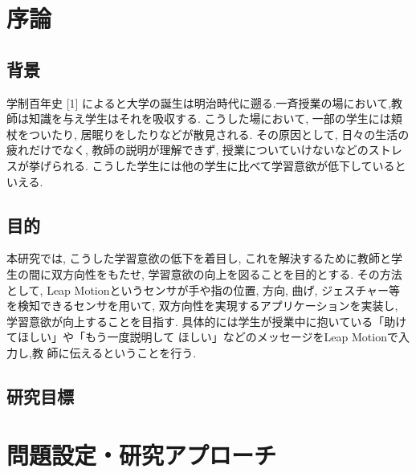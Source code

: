 \documentclass{funthesis}
\begin{document}
\chapter{序論} %


\section{背景} %


学制百年史 [1] によると大学の誕生は明治時代に遡る.一斉授業の場において,教師は知識を与え学生はそれを吸収する. こうした場において, 一部の学生には頬杖をついたり, 居眠りをしたりなどが散見される. その原因として, 日々の生活の疲れだけでなく, 教師の説明が理解できず, 授業についていけないなどのストレスが挙げられる. こうした学生には他の学生に比べて学習意欲が低下しているといえる.


\section{目的}
本研究では, こうした学習意欲の低下を着目し, これを解決するために教師と学生の間に双方向性をもたせ,  学習意欲の向上を図ることを目的とする. その方法として, Leap Motionというセンサが手や指の位置, 方向, 曲げ, ジェスチャー等を検知できるセンサを用いて, 双方向性を実現するアプリケーションを実装し, 学習意欲が向上することを目指す. 具体的には学生が授業中に抱いている「助けてほしい」や「もう一度説明して ほしい」などのメッセージをLeap Motionで入力し,教 師に伝えるということを行う. 

\section{研究目標}


\chapter{問題設定・研究アプローチ} %
\end{document}
